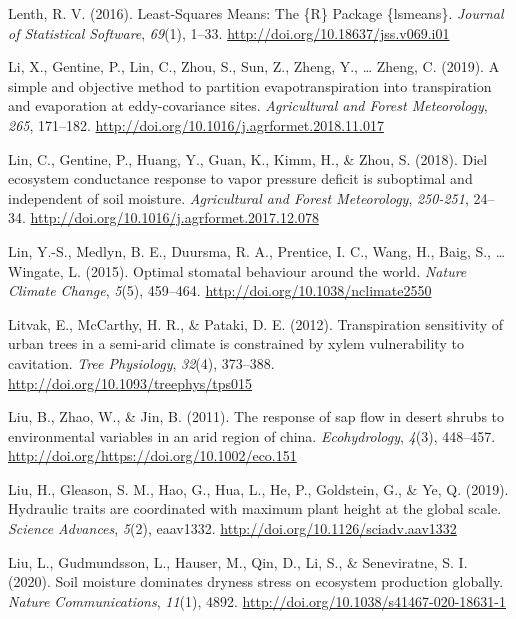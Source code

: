 \documentclass[11pt,twoside]{reedthesis}
\begin{document}
\hypertarget{ref-Lenth2016}{}
Lenth, R. V. (2016). Least-Squares Means: The \{R\} Package \{lsmeans\}.
\emph{Journal of Statistical Software}, \emph{69}(1), 1--33.
\url{http://doi.org/10.18637/jss.v069.i01}

\hypertarget{ref-li_simple_2019}{}
Li, X., Gentine, P., Lin, C., Zhou, S., Sun, Z., Zheng, Y., \ldots{}
Zheng, C. (2019). A simple and objective method to partition
evapotranspiration into transpiration and evaporation at eddy-covariance
sites. \emph{Agricultural and Forest Meteorology}, \emph{265}, 171--182.
\url{http://doi.org/10.1016/j.agrformet.2018.11.017}

\hypertarget{ref-lin_diel_2018}{}
Lin, C., Gentine, P., Huang, Y., Guan, K., Kimm, H., \& Zhou, S. (2018).
Diel ecosystem conductance response to vapor pressure deficit is
suboptimal and independent of soil moisture. \emph{Agricultural and
Forest Meteorology}, \emph{250-251}, 24--34.
\url{http://doi.org/10.1016/j.agrformet.2017.12.078}

\hypertarget{ref-lin_optimal_2015}{}
Lin, Y.-S., Medlyn, B. E., Duursma, R. A., Prentice, I. C., Wang, H.,
Baig, S., \ldots{} Wingate, L. (2015). Optimal stomatal behaviour around
the world. \emph{Nature Climate Change}, \emph{5}(5), 459--464.
\url{http://doi.org/10.1038/nclimate2550}

\hypertarget{ref-litvak_transpiration_2012}{}
Litvak, E., McCarthy, H. R., \& Pataki, D. E. (2012). Transpiration
sensitivity of urban trees in a semi-arid climate is constrained by
xylem vulnerability to cavitation. \emph{Tree Physiology}, \emph{32}(4),
373--388. \url{http://doi.org/10.1093/treephys/tps015}

\hypertarget{ref-Liu2011}{}
Liu, B., Zhao, W., \& Jin, B. (2011). The response of sap flow in desert
shrubs to environmental variables in an arid region of china.
\emph{Ecohydrology}, \emph{4}(3), 448--457.
\url{http://doi.org/https://doi.org/10.1002/eco.151}

\hypertarget{ref-liu_hydraulic_2019}{}
Liu, H., Gleason, S. M., Hao, G., Hua, L., He, P., Goldstein, G., \& Ye,
Q. (2019). Hydraulic traits are coordinated with maximum plant height at
the global scale. \emph{Science Advances}, \emph{5}(2), eaav1332.
\url{http://doi.org/10.1126/sciadv.aav1332}

\hypertarget{ref-liu_soil_2020}{}
Liu, L., Gudmundsson, L., Hauser, M., Qin, D., Li, S., \& Seneviratne,
S. I. (2020). Soil moisture dominates dryness stress on ecosystem
production globally. \emph{Nature Communications}, \emph{11}(1), 4892.
\url{http://doi.org/10.1038/s41467-020-18631-1}
\end{document}
